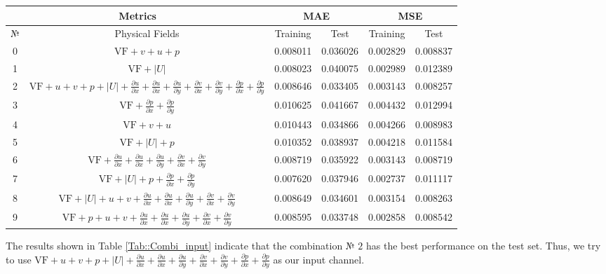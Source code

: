\documentclass{article}
\begin{document}
\begin{table*}
\centering
\caption{Comparison optimal designs between physical fielData Set \label{Tab::Combi_input}}
\begin{tabular}{|c|c|c|c|c|c|}
\hline \multicolumn{2}{|c|}{ Metrics } & \multicolumn{2}{|c|}{ MAE } & \multicolumn{2}{|c|}{ MSE } \\
\hline № & Physical Fields & Training  & Test & Training & Test \\
\hline 0 & $\mathrm{VF}+v+u+p$  & 0.008011 & 0.036026 & 0.002829 & 0.008837 \\
\hline 1 & $\mathrm{VF}+|U|$ & 0.008023 & 0.040075 & 0.002989 & 0.012389 \\
\hline 2 & $\mathrm{VF}+u + v + p + |U| + \frac{\partial u}{\partial x} + \frac{\partial u}{\partial x}+ \frac{\partial u}{\partial y}+ \frac{\partial v}{\partial x}+ \frac{\partial v}{\partial y} + \frac{\partial p}{\partial x} + \frac{\partial p}{\partial y}$ & 0.008646 & 0.033405 & 0.003143 & 0.008257\\
\hline 3 & $\mathrm{VF}+ \frac{\partial p}{\partial x} + \frac{\partial p}{\partial y}$ & 0.010625 & 0.041667 & 0.004432 & 0.012994 \\
\hline 4 & $\mathrm{VF}+v+u$  & 0.010443 & 0.034866 & 0.004266 & 0.008983 \\
\hline 5 & $\mathrm{VF}+ |U| + p$ & 0.010352 & 0.038937 & 0.004218 & 0.011584 \\
\hline 6 & $\mathrm{VF}+\frac{\partial u}{\partial x} + \frac{\partial u}{\partial x}+ \frac{\partial u}{\partial y}+ \frac{\partial v}{\partial x}+ \frac{\partial v}{\partial y}$ & 0.008719 & 0.035922  & 0.003143 & 0.008719\\
\hline 7 & $\mathrm{VF}+|U| + p +  \frac{\partial p}{\partial x} + \frac{\partial p}{\partial y}$ & 0.007620 & 0.037946 & 0.002737 & 0.011117 \\
\hline 8 & $\mathrm{VF}+ |U| +u + v + \frac{\partial u}{\partial x} + \frac{\partial u}{\partial x}+ \frac{\partial u}{\partial y}+ \frac{\partial v}{\partial x}+ \frac{\partial v}{\partial y}$ & 0.008649 & 0.034601& 0.003154 & 0.008263 \\
\hline 9 & $\mathrm{VF}+ p +u + v  + \frac{\partial u}{\partial x} + \frac{\partial u}{\partial x}+ \frac{\partial u}{\partial y}+ \frac{\partial v}{\partial x}+ \frac{\partial v}{\partial y}$ & 0.008595 & 0.033748& 0.002858 & 0.008542 \\
\hline
\end{tabular}
\end{table*}
The results shown in Table \ref{Tab::Combi_input} indicate that the combination № $2$ has the best performance on the test set. Thus, we try to use  $\mathrm{VF}+u + v + p + |U| + \frac{\partial u}{\partial x} + \frac{\partial u}{\partial x}+ \frac{\partial u}{\partial y}+ \frac{\partial v}{\partial x}+ \frac{\partial v}{\partial y} + \frac{\partial p}{\partial x} + \frac{\partial p}{\partial y}$ as our input channel.
\end{document}
